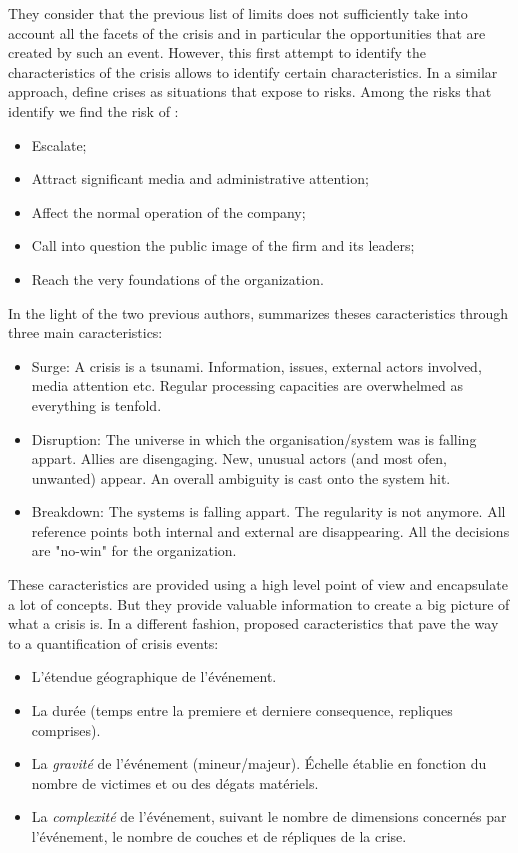 They consider that the previous list of limits does not sufficiently take into account all the facets of the crisis and in particular the opportunities that are created by such an event.
However, this first attempt to identify the characteristics of the crisis allows to identify certain characteristics.
In a similar approach, \cite{finkCrisisManagementPlanning1986} define crises as situations that expose to risks.
Among the risks that identify we find the risk of :
\begin{itemize}
    \item Escalate;
    \item Attract significant media and administrative attention;
    \item Affect the normal operation of the company;
    \item Call into question the public image of the firm and its leaders;
    \item Reach the very foundations of the organization.
\end{itemize}
In the light of the two previous authors, \cite{lagadecGESTIONCRISES1994} summarizes theses caracteristics through three main caracteristics:
\begin{itemize}
    \item Surge: A crisis is a tsunami. Information, issues, external actors involved, media attention etc.
          Regular processing capacities are overwhelmed as everything is tenfold.
    \item Disruption: The universe in which the organisation/system was is falling appart. Allies are disengaging. New, unusual actors (and most ofen, unwanted) appear.
          An overall ambiguity is cast onto the system hit.
    \item Breakdown: The systems is falling appart. The regularity is not anymore. All reference points both internal and external are disappearing.
          All the decisions are "no-win" for the organization.
\end{itemize}
These caracteristics are provided using a high level point of view and encapsulate a lot of concepts.
But they provide valuable information to create a big picture of what a crisis is.
In a different fashion, \cite{fertierInterpretationAutomatiqueDonnees2018a} proposed caracteristics that pave the way to a quantification of crisis events:
\begin{itemize}
    \item L'étendue géographique de l'événement.
    \item La durée (temps entre la premiere et derniere consequence, repliques comprises).
    \item La \emph{gravité} de l'événement (mineur/majeur). Échelle établie en fonction du nombre de victimes et ou des dégats matériels.
    \item La \emph{complexité} de l'événement, suivant le nombre de dimensions concernés par l'événement, le nombre de couches et de répliques de la crise.
\end{itemize}

